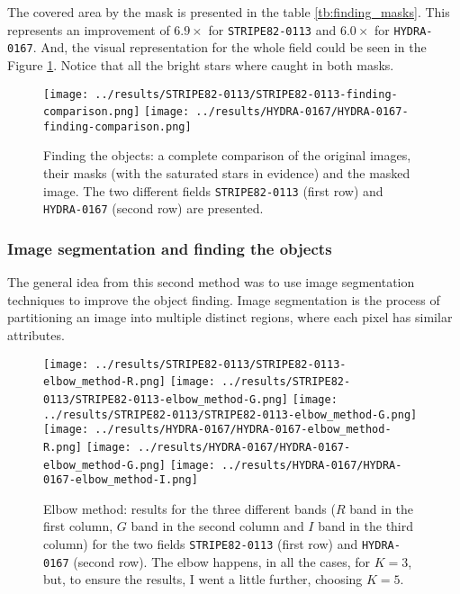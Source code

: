 \documentclass{article}
\begin{document}
The covered area by the mask is presented in the table \ref{tb:finding_masks}. This represents an improvement of $6.9 \times$ for \texttt{STRIPE82-0113} and $6.0 \times$ for \texttt{HYDRA-0167}. And, the visual representation for the whole field could be seen in the Figure \ref{fig:complete_mask_finding}. Notice that all the bright stars where caught in both masks.

\begin{figure}[h!]
  \centering
  \texttt{[image: ../results/STRIPE82-0113/STRIPE82-0113-finding-comparison.png]}
  \texttt{[image: ../results/HYDRA-0167/HYDRA-0167-finding-comparison.png]}
  \caption{Finding the objects: a complete comparison of the original images, their masks (with the saturated stars in evidence) and the masked image. The two different fields \texttt{STRIPE82-0113} (first row) and \texttt{HYDRA-0167} (second row) are presented.}
  \label{fig:complete_mask_finding}
\end{figure}

\subsubsection{Image segmentation and finding the objects}

The general idea from this second method was to use image segmentation techniques to improve the object finding. Image segmentation is the process of partitioning an image into multiple distinct regions, where each pixel has similar attributes.

\begin{figure}[h!]
  \centering
  \texttt{[image: ../results/STRIPE82-0113/STRIPE82-0113-elbow\_method-R.png]}
  \texttt{[image: ../results/STRIPE82-0113/STRIPE82-0113-elbow\_method-G.png]}
  \texttt{[image: ../results/STRIPE82-0113/STRIPE82-0113-elbow\_method-G.png]}
  \texttt{[image: ../results/HYDRA-0167/HYDRA-0167-elbow\_method-R.png]}
  \texttt{[image: ../results/HYDRA-0167/HYDRA-0167-elbow\_method-G.png]}
  \texttt{[image: ../results/HYDRA-0167/HYDRA-0167-elbow\_method-I.png]}
  \caption{Elbow method: results for the three different bands ($R$ band in the first column, $G$ band in the second column and $I$ band in the third column) for the two fields \texttt{STRIPE82-0113} (first row) and \texttt{HYDRA-0167} (second row). The elbow happens, in all the cases, for $K = 3$, but, to ensure the results, I went a little further, choosing $K = 5$.}
  \label{fig:elbow_method}
\end{figure}
\end{document}
